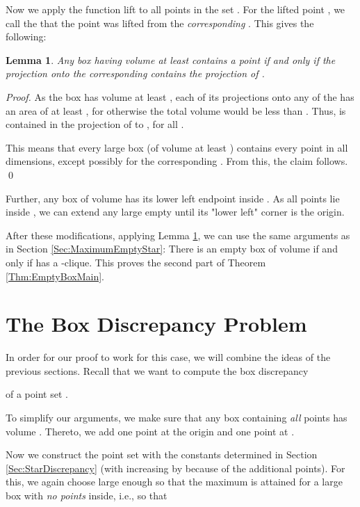 \documentclass[12pt]{article}
\newtheorem{lemma}{Lemma}
\begin{document}
Now we apply the function lift to all points in the set . For the lifted point , we call the  that the point was lifted from the \emph{corresponding} . This gives the following:
\begin{lemma}\label{Lemma:LiftingLemma} Any box  having volume at least  contains a point  if and only if the projection onto the corresponding  contains the projection of .
\end{lemma}
\begin{proof} As the box has volume at least , each of its projections onto any of the  has an area of at least , for otherwise the total volume would be less than . Thus,  is contained in the projection of  to , for all . 

This means that every large box (of volume at least ) contains every point in all dimensions, except possibly for the corresponding . From this, the claim follows. \qed
\end{proof}

Further, any box of volume  has its lower left endpoint inside . As all points lie inside , we can extend any large empty until its "lower left" corner is the origin. 

After these modifications, applying Lemma \ref{Lemma:LiftingLemma}, we can use the same arguments as in Section \ref{Sec:MaximumEmptyStar}: There is an empty box of volume  if and only if  has a -clique. This proves the second part of Theorem \ref{Thm:EmptyBoxMain}.






\section{The Box Discrepancy Problem}\label{Sec:BoxDiscrepancy}
In order for our proof to work for this case, we will combine the ideas of the previous sections. Recall that we want to compute the box discrepancy

of a point set .

To simplify our arguments, we make sure that any box containing \emph{all} points has volume . Thereto, we add one point at the origin and one point at . 

Now we construct the point set with the constants determined in Section \ref{Sec:StarDiscrepancy} (with  increasing by  because of the additional points). For this, we again choose  large enough so that the maximum is attained for a large box with \emph{no points} inside, i.e., so that
\end{document}
